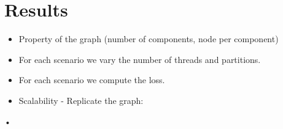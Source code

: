 \section{Results}
\begin{itemize}
\item Property of the graph (number of components, node per component)

\item For each scenario we vary the number of threads and partitions. 

\item For each scenario we compute the loss. 

\item Scalability - Replicate the graph:
\end{itemize}

\begin{table}
\begin{tabular}{•}

\end{tabular}
\end{table}


